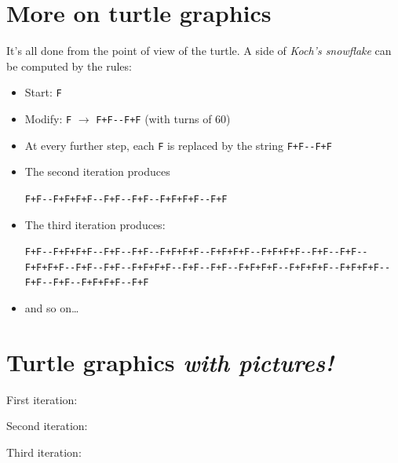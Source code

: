 \documentclass[bigger]{beamer}
\begin{document}
\section*{More on turtle graphics}
\label{sec:orgcd1c995}

It's all done from the point of view of the turtle.  A side of \emph{Koch's
snowflake} can be computed by the rules:

\begin{itemize}
\item Start: \texttt{F}
\item Modify: \texttt{F} \(\rightarrow\) \texttt{F+F-{}-F+F} (with turns of 60\textdegree{})
\item At every further step, each \texttt{F} is replaced by the string \texttt{F+F-{}-F+F}
\item The second iteration produces

\texttt{F+F-{}-F+F+F+F-{}-F+F-{}-F+F-{}-F+F+F+F-{}-F+F}
\item The third iteration produces:

\texttt{F+F-{}-F+F+F+F-{}-F+F-{}-F+F-{}-F+F+F+F-{}-F+F+F+F-{}-F+F+F+F-{}-F+F-{}-F+F-{}-F+F+F+F-{}-F+F-{}-F+F-{}-F+F+F+F-{}-F+F-{}-F+F-{}-F+F+F+F-{}-F+F+F+F-{}-F+F+F+F-{}-F+F-{}-F+F-{}-F+F+F+F-{}-F+F}
\item and so on\ldots{}
\end{itemize}

\section*{Turtle graphics \emph{with pictures!}}
\label{sec:org4335b0d}


First iteration:~

Second iteration:~

Third iteration:~
\end{document}
